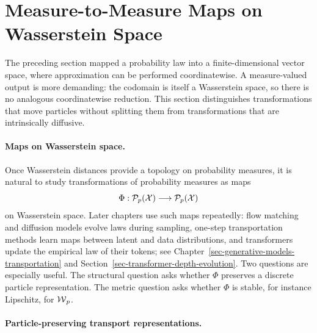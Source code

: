\section{Measure-to-Measure Maps on Wasserstein Space}\label{sec-measure-to-measure-maps}

The preceding section mapped a probability law into a finite-dimensional vector space, where approximation can be performed coordinatewise. A measure-valued output is more demanding: the codomain is itself a Wasserstein space, so there is no analogous coordinatewise reduction. This section distinguishes transformations that move particles without splitting them from transformations that are intrinsically diffusive.

\paragraph{Maps on Wasserstein space.}

Once Wasserstein distances provide a topology on probability measures, it is natural to study transformations of probability measures as maps
\[
	\Phi:\mathcal{P}_p(\mathcal{X})\longrightarrow \mathcal{P}_p(\mathcal{X})
\]
on Wasserstein space. Later chapters use such maps repeatedly: flow matching and diffusion models evolve laws during sampling, one-step transportation methods learn maps between latent and data distributions, and transformers update the empirical law of their tokens; see Chapter~\ref{sec-generative-models-transportation} and Section~\ref{sec-transformer-depth-evolution}. Two questions are especially useful. The structural question asks whether $\Phi$ preserves a discrete particle representation. The metric question asks whether $\Phi$ is stable, for instance Lipschitz, for $\operatorname{\mathcal{W}}_p$.

\paragraph{Particle-preserving transport representations.}

